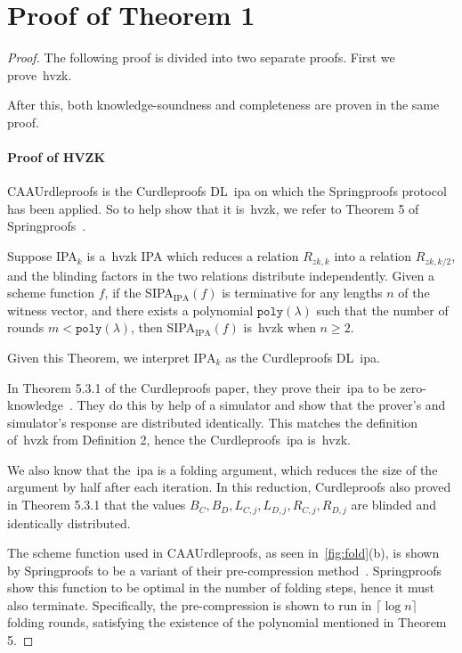 
\section{Proof of Theorem 1}\label{sec:appendix-thm1proof}
\begin{proof}
    The following proof is divided into two separate proofs.
    First we prove~\gls{hvzk}.

    After this, both knowledge-soundness and completeness are proven in the same proof.

    \paragraph*{\textbf{Proof of HVZK}}
    CAAUrdleproofs is the Curdleproofs DL~\gls{ipa} on which the Springproofs protocol has been applied.
    So to help show that it is~\gls{hvzk}, we refer to Theorem 5 of Springproofs~\cite{zhang2024springproofs}.
    \begin{theorem}
        Suppose IPA$_k$ is a~\gls{hvzk} IPA which reduces a relation $R_{zk,k}$ into a relation $R_{zk,k/2}$, and the blinding factors in the two relations distribute independently.
        Given a scheme function $f$, if the SIPA$_{\text{IPA}}(f)$ is terminative for any lengths $n$ of the witness vector, and there exists a polynomial $\texttt{poly}(\lambda)$ such that the number of rounds $m<\texttt{poly}(\lambda)$, then SIPA$_{\text{IPA}}(f)$ is~\gls{hvzk} when $n\geq2$.
    \end{theorem}
    Given this Theorem, we interpret $\text{IPA}_k$ as the Curdleproofs DL~\gls{ipa}.

    In Theorem 5.3.1 of the Curdleproofs paper, they prove their~\gls{ipa} to be zero-knowledge~\cite{Curdleproofs}.
    They do this by help of a simulator and show that the prover's and simulator's response are distributed identically.
    This matches the definition of~\gls{hvzk} from Definition 2, hence the Curdleproofs~\gls{ipa} is~\gls{hvzk}.

    We also know that the~\gls{ipa} is a folding argument, which reduces the size of the argument by half after each iteration.
    In this reduction, Curdleproofs also proved in Theorem 5.3.1 that the values $B_C,B_D,L_{C,j},L_{D,j},R_{C,j},R_{D,j}$ are blinded and identically distributed.

    The scheme function used in CAAUrdleproofs, as seen in~\autoref{fig:fold}(b), is shown by Springproofs to be a variant of their pre-compression method~\cite{zhang2024springproofs}.
    Springproofs show this function to be optimal in the number of folding steps, hence it must also terminate.
    Specifically, the pre-compression is shown to run in $\lceil \log n\rceil$ folding rounds, satisfying the existence of the polynomial mentioned in Theorem 5.


\end{proof}
